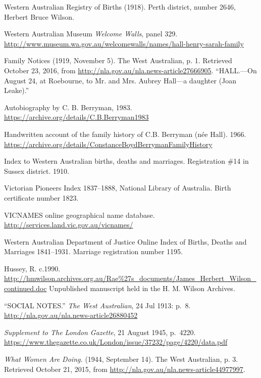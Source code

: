 \begin{thebibliography}{999}
\footnotesize

    Western Australian Registry of Births (1918). Perth district, number 2646, Herbert Bruce Wilson.

	Western Australian Museum \emph{Welcome Walls}, panel 329.
	\url{http://www.museum.wa.gov.au/welcomewalls/names/hall-henry-sarah-family}

	Family Notices (1919, November 5). The West Australian, p. 1.
	Retrieved October 23, 2016, from \url{http://nla.gov.au/nla.news-article27666905}.
	``HALL.---On August 24, at Roebourne, to Mr. and Mrs. Aubrey Hall---a daughter (Joan Leake).''

	Autobiography by C. B. Berryman, 1983.
	\url{https://archive.org/details/C.B.Berryman1983}

	Handwritten account of the family history of C.B. Berryman (n\'{e}e Hall). 1966.
	\url{https://archive.org/details/ConstanceBoydBerrymanFamilyHistory}

	Index to Western Australian births, deaths and marriages.
	Registration \#14 in Sussex district. 1910.

	Victorian Pioneers Index 1837--1888, National Library of Australia.
	Birth certificate number 1823.

	VICNAMES online geographical name database.
	\url{http://services.land.vic.gov.au/vicnames/}

	Western Australian Department of Justice Online Index of Births, Deaths and Marriages 1841–1931.
	Marriage registration number 1195.

	Hussey, R. c.1990.
	\url{http://hmwilson.archives.org.au/Rae\%27s_documents/James_Herbert_Wilson_continued.doc}
	Unpublished manuscript held in the H. M. Wilson Archives.

	``SOCIAL NOTES.'' \emph{The West Australian}, 24 Jul 1913: p.\ 8.
	\url{http://nla.gov.au/nla.news-article26880452}

	\emph{Supplement to The London Gazette}, 21 August 1945, p.\ 4220.
	\url{https://www.thegazette.co.uk/London/issue/37232/page/4220/data.pdf}

	\emph{What Women Are Doing.} (1944, September 14). The West Australian, p. 3.
	Retrieved October 21, 2015, from \url{http://nla.gov.au/nla.news-article44977997}.


\end{thebibliography}
